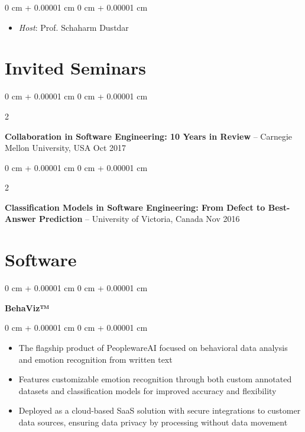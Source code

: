 \documentclass[10pt, a4paper]{article}
\newenvironment{highlights}{
    \begin{itemize}[
        topsep=0.10 cm,
        parsep=0.10 cm,
        partopsep=0pt,
        itemsep=0pt,
        leftmargin=0 cm + 10pt
    ]
}{
    \end{itemize}
} %
\newenvironment{onecolentry}{
    \begin{adjustwidth}{
        0 cm + 0.00001 cm
    }{
        0 cm + 0.00001 cm
    }
}{
    \end{adjustwidth}
} %
\newenvironment{twocolentry}[2][]{
    \onecolentry
    \def\secondColumn{#2}
    \setcolumnwidth{\fill, 4.5 cm}
    \begin{paracol}{2}
}{
    \switchcolumn \raggedleft \secondColumn
    \end{paracol}
    \endonecolentry
} %
\begin{document}
        \vspace{0.10 cm}
        \begin{onecolentry}
            \begin{highlights}
                \item \textit{Host}: Prof. Schaharm Dustdar
            \end{highlights}
        \end{onecolentry}



    
    \section{Invited Seminars}



        
        \begin{twocolentry}{
            Oct 2017
        }
            \textbf{Collaboration in Software Engineering: 10 Years in Review} -- Carnegie Mellon University, USA\end{twocolentry}



        \vspace{0.2 cm}

        \begin{twocolentry}{
            Nov 2016
        }
            \textbf{Classification Models in Software Engineering: From Defect to Best-Answer Prediction} -- University of Victoria, Canada\end{twocolentry}




    
    \section{Software}



        
        \begin{onecolentry}
            \textbf{BehaViz™}\end{onecolentry}

        \vspace{0.10 cm}
        \begin{onecolentry}
            \begin{highlights}
                \item The flagship product of PeoplewareAI focused on behavioral data analysis and emotion recognition from written text
                \item Features customizable emotion recognition through both custom annotated datasets and classification models for improved accuracy and flexibility
                \item Deployed as a cloud-based SaaS solution with secure integrations to customer data sources, ensuring data privacy by processing without data movement
            \end{highlights}
        \end{onecolentry}
\end{document}

